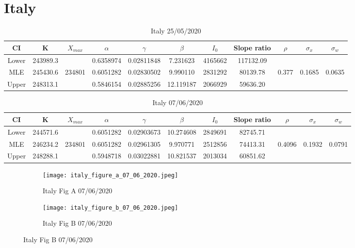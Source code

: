 \documentclass{article}
\begin{document}
\section{Italy}

\begin{table}[ht]
    \centering
\begin{tabular}{|c|c|c|c|c|c|c|c|c|c|c|}
     \hline
     CI & K & $X_{max}$ & $\alpha$ & $\gamma$ & $\beta$ & $I_0$ & Slope ratio  & $\rho$ & $\sigma_x$ & $\sigma_w$ \\
     \hline
     \hline
Lower	&243989.3 & 	&0.6358974&	0.02811848&	7.231623	&4165662	&117132.09 & & & \\
     \hline
MLE	    &245430.6 & 234801 &0.6051282&	0.02830502&	9.990110	&2831292	&80139.78 & 0.377 & 0.1685 & 0.0635\\
     \hline
 Upper	&248313.1& 	&0.5846154&	0.02885256&	12.119187&	2066929&	59636.20 & & &\\
    \hline
\end{tabular}
    \caption{Italy 25/05/2020}
\end{table}

\begin{table}[ht]
    \centering
\begin{tabular}{|c|c|c|c|c|c|c|c|c|c|c|}
     \hline
     CI & K & $X_{max}$ & $\alpha$ & $\gamma$ & $\beta$ & $I_0$ & Slope ratio  & $\rho$ & $\sigma_x$ & $\sigma_w$ \\
     \hline
     \hline
Lower & 244571.6 & & 0.6051282&	0.02903673	&10.274608&	2849691& 82745.71 & & &  \\
     \hline
MLE	 & 246234.2	& 234801 &0.6051282&	0.02961305	&9.970771	&2512856	&74413.31 & 0.4096& 0.1932 & 0.0791 \\
     \hline
Upper& 248288.1	& & 0.5948718&	0.03022881	&10.821537&	2013034& 60851.62 & & & \\
    \hline
\end{tabular}
    \caption{Italy 07/06/2020}
\end{table}


\begin{figure}[htb]
\centering
    \begin{subfigure}{0.5\textwidth}
        \texttt{[image: italy\_figure\_a\_07\_06\_2020.jpeg]}
        \caption{Italy Fig A 07/06/2020}
        \label{fig:italy_figure_a_07_06_2020}
    \end{subfigure}%
        \begin{subfigure}{0.5\textwidth}                                   \texttt{[image: italy\_figure\_b\_07\_06\_2020.jpeg]}
        \caption{Italy Fig B 07/06/2020}
        \label{fig:italy_figure_b_07_06_2020}
    \end{subfigure}
\end{figure}
\end{document}
